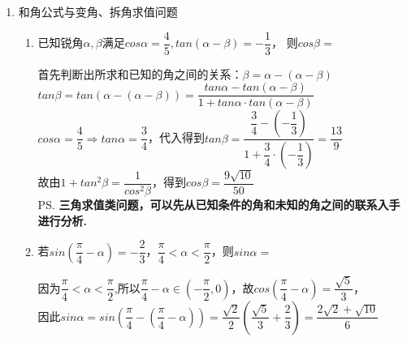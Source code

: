 \begin{enumerate}
\begin{enumerate}
\begin{jieda}
            若$B = \dfrac{5\pi}{6}$，则必有$A+B > \pi$，不符合要求，因此$B = \dfrac{\pi}{6}, cosB = \dfrac{\sqrt{3}}{2}$，故$cosA = \dfrac{\sqrt{2}}{2}$，因此$A = \dfrac{\pi}{4}$. 故$C = \pi - A - B = \dfrac{7\pi}{12}$
        \end{jieda}
    \end{enumerate}
    \item 和角公式与变角、拆角求值问题
    \begin{enumerate}
        \item 已知锐角$\alpha, \beta$满足$cos\alpha = \dfrac{4}{5}, tan(\alpha - \beta) = -\dfrac{1}{3}$， 则$cos\beta=$ 
        \begin{jieda}
            首先判断出所求和已知的角之间的关系：$\beta = \alpha - (\alpha - \beta)$ \\
            $tan\beta = tan(\alpha - (\alpha - \beta)) = \dfrac{tan\alpha - tan(\alpha - \beta)}{1 + tan\alpha \cdot tan(\alpha - \beta)}$ \\
            $cos\alpha = \dfrac{4}{5} \Longrightarrow tan\alpha = \dfrac{3}{4}$，代入得到$tan\beta = \dfrac{\dfrac{3}{4} - \left(-\dfrac{1}{3}\right)}{1 + \dfrac{3}{4} \cdot \left (-\dfrac{1}{3} \right)} = \dfrac{13}{9}$\\
            故由$1 + tan^2\beta = \dfrac{1}{cos^2\beta}$，得到$cos\beta = \dfrac{9\sqrt{10}}{50}$ \\
            \ps \textbf{三角求值类问题，可以先从已知条件的角和未知的角之间的联系入手进行分析.}
        \end{jieda}
        \item 若$sin(\dfrac{\pi}{4} - \alpha) = -\dfrac{2}{3}$，$\dfrac{\pi}{4} < \alpha < \dfrac{\pi}{2}$，则$sin\alpha = $
        \begin{jieda}
            因为$\dfrac{\pi}{4} < \alpha < \dfrac{\pi}{2}$,所以$\dfrac{\pi}{4} - \alpha \in (-\dfrac{\pi}{2}, 0)$，故$cos(\dfrac{\pi}{4} - \alpha) = \dfrac{\sqrt{5}}{3}$，\\
            因此$sin\alpha = sin(\dfrac{\pi}{4} - (\dfrac{\pi}{4} - \alpha)) = \dfrac{\sqrt{2}}{2}(\dfrac{\sqrt{5}}{3} + \dfrac{2}{3}) = \dfrac{2\sqrt{2}+\sqrt{10}}{6}$
        \end{jieda}
        

\end{enumerate}
\end{enumerate}
